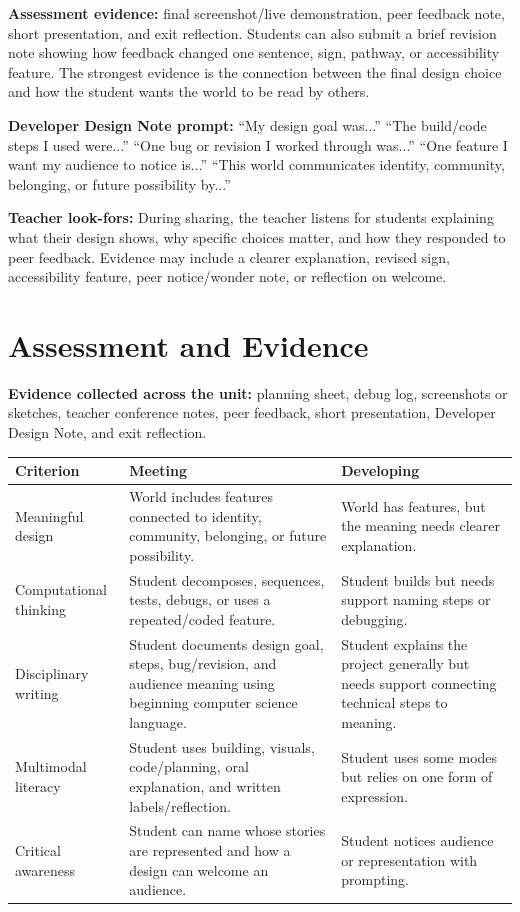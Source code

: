 \textbf{Assessment evidence:} final screenshot/live demonstration, peer feedback note, short presentation, and exit reflection. Students can also submit a brief revision note showing how feedback changed one sentence, sign, pathway, or accessibility feature. The strongest evidence is the connection between the final design choice and how the student wants the world to be read by others.

\textcolor{LessonTwoAccent}{\textbf{Developer Design Note prompt:} ``My design goal was...'' ``The build/code steps I used were...'' ``One bug or revision I worked through was...'' ``One feature I want my audience to notice is...'' ``This world communicates identity, community, belonging, or future possibility by...''}

\textbf{Teacher look-fors:} During sharing, the teacher listens for students explaining what their design shows, why specific choices matter, and how they responded to peer feedback. Evidence may include a clearer explanation, revised sign, accessibility feature, peer notice/wonder note, or reflection on welcome.

\newpage
\section*{Assessment and Evidence}

\textbf{Evidence collected across the unit:} planning sheet, debug log, screenshots or sketches, teacher conference notes, peer feedback, short presentation, Developer Design Note, and exit reflection.

\renewcommand{\arraystretch}{0.95}
\setlength{\tabcolsep}{3pt}
\begin{tabularx}{\textwidth}{|>{\raggedright\arraybackslash}p{}|Y|Y|}
\hline
{}
\textbf{Criterion} & \textbf{Meeting} & \textbf{Developing} \\ \hline
Meaningful design & World includes features connected to identity, community, belonging, or future possibility. & World has features, but the meaning needs clearer explanation. \\ \hline
Computational thinking & Student decomposes, sequences, tests, debugs, or uses a repeated/coded feature. & Student builds but needs support naming steps or debugging. \\ \hline
Disciplinary writing & \textcolor{LessonTwoAccent}{Student documents design goal, steps, bug/revision, and audience meaning using beginning computer science language.} & \textcolor{LessonTwoAccent}{Student explains the project generally but needs support connecting technical steps to meaning.} \\ \hline
Multimodal literacy & Student uses building, visuals, code/planning, oral explanation, and written labels/reflection. & Student uses some modes but relies on one form of expression. \\ \hline
Critical awareness & Student can name whose stories are represented and how a design can welcome an audience. & Student notices audience or representation with prompting. \\ \hline
\end{tabularx}


